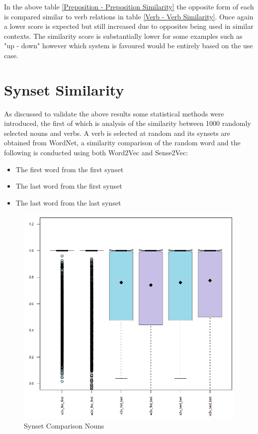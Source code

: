 \noindent
In the above table \ref{Preposition - Preposition Similarity} the opposite form of each is compared similar to verb relations in table \ref{Verb - Verb Similarity}. Once again a lower score is expected but still increased due to opposites being used in similar contexts. The similarity score is substantially lower for some examples such as "up - down" however which system is favoured would be entirely based on the use case.

\section{Synset Similarity}
As discussed to validate the above results some statistical methods were introduced, the first of which is analysis of the similarity between 1000 randomly selected nouns and verbs. A verb is selected at random and its synsets are obtained from WordNet, a similarity comparison of the random word and the following is conducted using both Word2Vec and Sense2Vec:
\begin{itemize}
  \item The first word from the first synset
  \item The last word from the first synset
  \item The last word from the last synset
\end{itemize}

\begin{figure}[H]
\centering
  \includegraphics[width=\textwidth]{images/wordnet_nouns.PNG}
  \caption{Synset Comparison Nouns}
  \label{fig:wordnet_nouns}
\end{figure}

